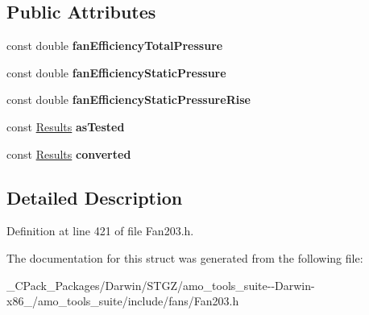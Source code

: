 \subsection*{Public Attributes}
\begin{DoxyCompactItemize}
\item 
\mbox{\label{struct_fan203_1_1_output_a1c693f72537a3b09c5675e9597582b99}} 
const double {\bfseries fan\+Efficiency\+Total\+Pressure}
\item 
\mbox{\label{struct_fan203_1_1_output_a3ed8a45f96d2c0d59f5c4780dfa706f5}} 
const double {\bfseries fan\+Efficiency\+Static\+Pressure}
\item 
\mbox{\label{struct_fan203_1_1_output_a65e4c8f90e87720f09f5691a75ef34b8}} 
const double {\bfseries fan\+Efficiency\+Static\+Pressure\+Rise}
\item 
\mbox{\label{struct_fan203_1_1_output_a82901834cabb87e119d0b1186a06aeae}} 
const \hyperlink{struct_fan203_1_1_results}{Results} {\bfseries as\+Tested}
\item 
\mbox{\label{struct_fan203_1_1_output_a775ac959a1b54c2cdb2eb695fcb3ace3}} 
const \hyperlink{struct_fan203_1_1_results}{Results} {\bfseries converted}
\end{DoxyCompactItemize}


\subsection{Detailed Description}


Definition at line 421 of file Fan203.\+h.



The documentation for this struct was generated from the following file\+:\begin{DoxyCompactItemize}
\item 
\+\_\+\+C\+Pack\+\_\+\+Packages/\+Darwin/\+S\+T\+G\+Z/amo\+\_\+tools\+\_\+suite-\/-\/\+Darwin-\/x86\+\_/amo\+\_\+tools\+\_\+suite/include/fans/Fan203.\+h\end{DoxyCompactItemize}
